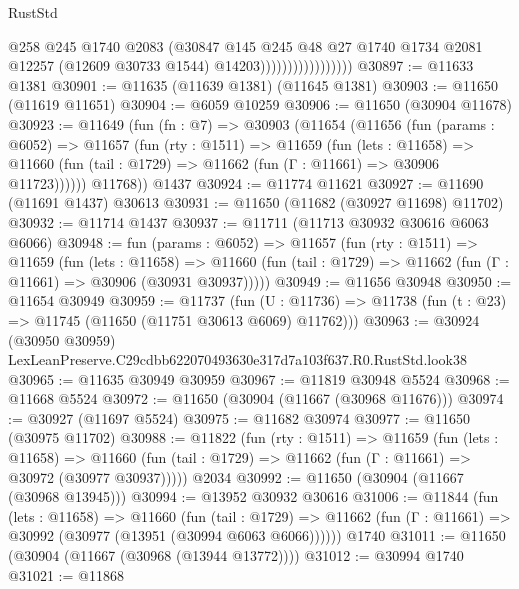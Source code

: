 \begin{lexlean}{RustStd}
\begin{coremodule}
                                    @258
                                    @245
                                    @1740
                                    @2083
                                    (@30847
                                      @145
                                      @245
                                      @48
                                      @27
                                      @1740
                                      @1734
                                      @2081
                                      @12257
                                      (@12609 @30733 @1544)
                                      @14203)))))))))))))))))
@30897 := @11633 @1381
@30901 := @11635 (@11639 @1381) (@11645 @1381)
@30903 := @11650 (@11619 @11651)
@30904 := @6059 @10259
@30906 := @11650 (@30904 @11678)
@30923 := @11649
    (fun (fn : @7) =>
    @30903
      (@11654
        (@11656
          (fun (params : @6052) =>
          @11657
            (fun (rty : @1511) =>
            @11659
              (fun (lets : @11658) =>
              @11660 (fun (tail : @1729) => @11662 (fun (Γ : @11661) => @30906 @11723))))))
        @11768))
    @1437
@30924 := @11774 @11621
@30927 := @11690 (@11691 @1437) @30613
@30931 := @11650 (@11682 (@30927 @11698) @11702)
@30932 := @11714 @1437
@30937 := @11711 (@11713 @30932 @30616 @6063 @6066)
@30948 := fun (params : @6052) =>
  @11657
    (fun (rty : @1511) =>
    @11659
      (fun (lets : @11658) =>
      @11660 (fun (tail : @1729) => @11662 (fun (Γ : @11661) => @30906 (@30931 @30937)))))
@30949 := @11656 @30948
@30950 := @11654 @30949
@30959 := @11737
    (fun (U : @11736) => @11738 (fun (t : @23) => @11745 (@11650 (@11751 @30613 @6069) @11762)))
@30963 := @30924 (@30950 @30959) LexLeanPreserve.C29cdbb622070493630e317d7a103f637.R0.RustStd.look38
@30965 := @11635 @30949 @30959
@30967 := @11819 @30948 @5524
@30968 := @11668 @5524
@30972 := @11650 (@30904 (@11667 (@30968 @11676)))
@30974 := @30927 (@11697 @5524)
@30975 := @11682 @30974
@30977 := @11650 (@30975 @11702)
@30988 := @11822
    (fun (rty : @1511) =>
    @11659
      (fun (lets : @11658) =>
      @11660 (fun (tail : @1729) => @11662 (fun (Γ : @11661) => @30972 (@30977 @30937)))))
    @2034
@30992 := @11650 (@30904 (@11667 (@30968 @13945)))
@30994 := @13952 @30932 @30616
@31006 := @11844
    (fun (lets : @11658) =>
    @11660
      (fun (tail : @1729) =>
      @11662 (fun (Γ : @11661) => @30992 (@30977 (@13951 (@30994 @6063 @6066))))))
    @1740
@31011 := @11650 (@30904 (@11667 (@30968 (@13944 @13772))))
@31012 := @30994 @1740
@31021 := @11868

\end{coremodule}
\end{lexlean}
